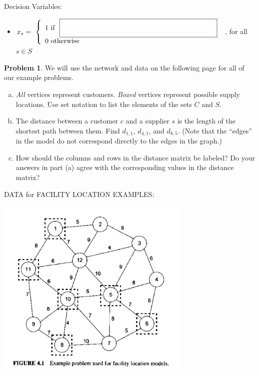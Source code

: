 \documentclass[11pt]{article}
\theoremstyle{definition}
\newtheorem{problem}{Problem}
\newcommand{\answerbox}[3]{%
  \fbox{%
    \begin{minipage}[#1]{#2}
      \hfill\vspace{#3}
    \end{minipage}
  }
}
\begin{document}
\smallskip
Decision Variables: 
\begin{itemize}
\item[] 
\def\arraystretch{1.8} 
$x_s = ~\left\{ 
\begin{array}{ll} 
1 \text{ if } ~\answerbox{c}{3in}{.7cm} \\ 
0 \text{ otherwise } 
\end{array} \right. $
, for all $s \in S$
\end{itemize}

\vspace{0.5cm}
\begin{problem} We will use the network and data on the following page for all of our example problems.
\begin{enumerate}[(a)] 
\item \emph{All} vertices represent customers.  \emph{Boxed} vertices represent possible supply locations. Use set notation to list the elements of the sets $C$ and $S$.  

\vspace{1.5cm}

\item The distance between a customer $c$ and a supplier $s$ is the length of the shortest path between them.
Find $d_{1,1}$, $d_{4,1}$, and $d_{8,5}$.  (Note that the ``edges'' in the model do not correspond directly to the edges in the graph.)

\vspace{1.5cm}

\item How should the columns and rows in the distance matrix be labeled?  Do your answers in part (a) agree with the corresponding values in the distance matrix?  

\vfill
\end{enumerate}
\end{problem}

\newpage
DATA for FACILITY LOCATION EXAMPLES:

\includegraphics[width = 0.7\textwidth]{facloc}
\end{document}
